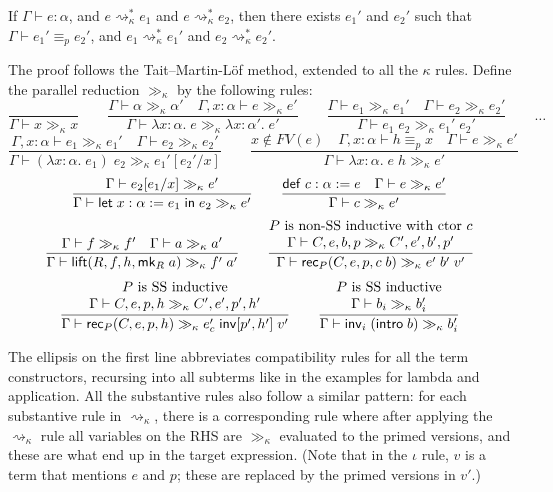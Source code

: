 \begin{theorem}\label{thm:church_rosser}
If $\Gamma\vdash e:\alpha$, and $e\rightsquigarrow_\kappa^* e_1$ and $e\rightsquigarrow_\kappa^* e_2$, then there exists $e_1'$ and $e_2'$ such that $\Gamma\vdash e_1'\equiv_p e_2'$, and $e_1\rightsquigarrow_\kappa^* e_1'$ and $e_2\rightsquigarrow_\kappa^* e_2'$.
\end{theorem}
The proof follows the Tait--Martin-L\"{o}f method, extended to all the $\kappa$ rules. Define the parallel reduction $\gg_\kappa$ by the following rules:
$$\frac{}{\Gamma\vdash x\gg_\kappa x}\qquad
\frac{\Gamma\vdash \alpha\gg_\kappa\alpha'\quad \Gamma,x:\alpha\vdash e\gg_\kappa e'}{\Gamma\vdash \lambda x:\alpha.\;e\gg_\kappa \lambda x:\alpha'.\;e'}\qquad
\frac{\Gamma\vdash e_1\gg_\kappa e_1'\quad \Gamma\vdash e_2\gg_\kappa e_2'}{\Gamma\vdash e_1\;e_2\gg_\kappa e_1'\;e_2'}\qquad\dots$$
$$\frac{\Gamma,x:\alpha\vdash e_1\gg_\kappa e_1'\quad \Gamma\vdash e_2\gg_\kappa e_2'}{\Gamma\vdash (\lambda x:\alpha.\;e_1)\;e_2\gg_\kappa e_1'[e_2'/x]}\qquad
\frac{x\notin FV(e)\quad \Gamma,x:\alpha\vdash h\equiv_p x\quad \Gamma\vdash e\gg_\kappa e'}{\Gamma\vdash \lambda x:\alpha.\;e\;h\gg_\kappa e'}$$
$$\frac{\Gamma\vdash e_2[e_1/x]\gg_\kappa e'}{\Gamma\vdash \elet{x:\alpha:=e_1}{e_2}\gg_\kappa e'}\qquad
\frac{\mathsf{def}\;c:\alpha:=e\quad \Gamma\vdash e\gg_\kappa e'}{\Gamma\vdash c\gg_\kappa e'}$$
$$\frac{\Gamma\vdash f\gg_\kappa f'\quad \Gamma\vdash a\gg_\kappa a'}{\Gamma\vdash \lift(R,f,h,\mk_R\;a)\gg_\kappa f'\;a'}\qquad
\frac{\begin{matrix}
P\mbox{ is non-SS inductive with ctor }c\\
\Gamma\vdash C,e,b,p\gg_\kappa C',e',b',p'
\end{matrix}}{\Gamma\vdash \rec_P(C,e,p,c\;b)\gg_\kappa e'\;b'\;v'}$$
$$\frac{\begin{matrix}
P\mbox{ is SS inductive}\\
\Gamma\vdash C,e,p,h\gg_\kappa C',e',p',h'
\end{matrix}}{\Gamma\vdash \rec_P(C,e,p,h)\gg_\kappa e_c'\;\inv[p',h']\;v'}\qquad
\frac{\begin{matrix}
P\mbox{ is SS inductive}\\
\Gamma\vdash b_i\gg_\kappa b_i'
\end{matrix}}{\Gamma\vdash \inv_i\;(\intro\;b)\gg_\kappa b_i'}$$

The ellipsis on the first line abbreviates compatibility rules for all the term constructors, recursing into all subterms like in the examples for lambda and application. All the substantive rules also follow a similar pattern: for each substantive rule in $\rightsquigarrow_\kappa$, there is a corresponding rule where after applying the $\rightsquigarrow_\kappa$ rule all variables on the RHS are $\gg_\kappa$ evaluated to the primed versions, and these are what end up in the target expression. (Note that in the $\iota$ rule, $v$ is a term that mentions $e$ and $p$; these are replaced by the primed versions in $v'$.)

